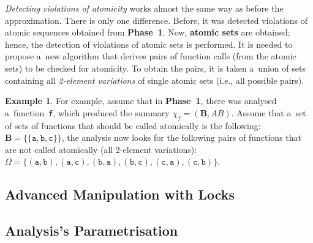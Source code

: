 \documentclass{ExcelAtFIT}
\theoremstyle{definition}
\newtheorem{example}{Example}[section]
\begin{document}
\emph{Detecting violations of atomicity} works almost the same way as before the approximation. There is only one difference. Before, it was detected violations of atomic sequences obtained from \textbf{Phase~1}. Now, \textbf{atomic sets} are obtained; hence, the detection of violations of atomic sets is performed. It is needed to propose a~new algorithm that derives pairs of function calls (from the atomic sets) to be checked for atomicity. To obtain the pairs, it is taken a~union of sets containing all \emph{2-element variations} of single atomic sets (i.e., all possible pairs).

\begin{example}
    \sloppy
    For example, assume that in \textbf{Phase~1}, there was analysed a~function~\texttt{f}, which produced the summary $ \chi_f = {(\boldsymbol{B}, AB)} $. Assume that a~set of sets of functions that should be called atomically is the following: $ \boldsymbol{B} = \{{\{\mathtt{a}, \mathtt{b}, \mathtt{c}\}}\} $, the analysis now looks for the following pairs of functions that are not called atomically (all 2-element variations): $ \Omega = \{{(\mathtt{a}, \mathtt{b})}, {(\mathtt{a}, \mathtt{c})}, {(\mathtt{b}, \mathtt{a})}, {(\mathtt{b}, \mathtt{c})}, {(\mathtt{c}, \mathtt{a})}, {(\mathtt{c}, \mathtt{b})}\} $.
\end{example}


\subsection{Advanced Manipulation with Locks}


\subsection{Analysis's Parametrisation}
\end{document}
